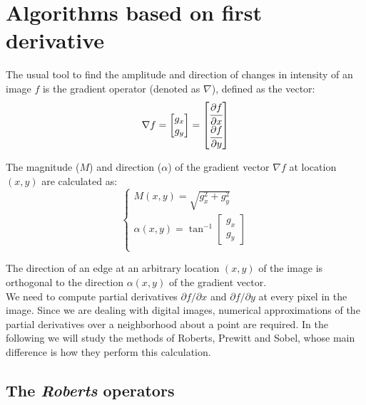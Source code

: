 \documentclass{ipol}
\numberwithin{equation}{section}
\numberwithin{table}{section}
\numberwithin{figure}{section}
\begin{document}
\nocite{IPOL}
\section{Algorithms based on first derivative}
\label{sec:first}

The usual tool to find the amplitude and direction of changes in 
intensity of an image $f$ is the gradient operator (denoted as $\nabla$), defined 
as the vector:
\begin{equation}
	\nabla f = 
				\begin{bmatrix} 
					g_x \\ g_y
				\end{bmatrix}
	=				
				\begin{bmatrix} 
					\cfrac{\partial f}{\partial x} \\ \cfrac{\partial f}{\partial y} \\
				\end{bmatrix}
\end{equation}

The magnitude ($M$) and direction ($\alpha$) of the gradient vector $\nabla f$ at location $(x,y)$
are calculated as:
\begin{equation}
	\begin{cases}
		M(x,y) = \sqrt{g_x^2 + g_y^2} \\
		\alpha(x,y) = \tan^{-1} \begin{bmatrix} g_x \\ g_y \end{bmatrix} \\
	\end{cases}
\end{equation}

The direction of an edge at an arbitrary location $(x,y)$ of the image is 
orthogonal to the direction $\alpha(x,y)$ of the gradient vector.\\

We need to compute partial derivatives $\partial f/\partial x$ and $\partial f/\partial y$ 
at every pixel in the image. Since we are dealing with digital images, numerical approximations 
of the partial derivatives over a neighborhood about a point are required. In the following we will study 
the methods of Roberts, Prewitt and Sobel, whose main difference is how they perform this calculation.\\

\subsection{The \textit{Roberts} operators}
\end{document}
